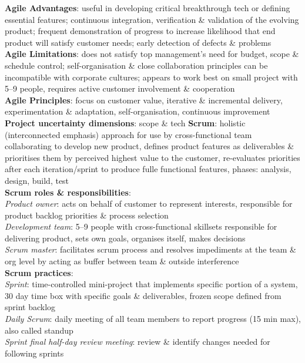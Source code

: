 \documentclass[a4paper]{article}
\begin{document}
\begin{multicols}{2}
        \textbf{Agile Advantages}: useful in developing critical breakthrough tech or defining essential features; continuous integration, verification \& validation of the evolving product; frequent demonstration of progress to increase likelihood that end product will satisfy customer needs; early detection of defects \& problems\\
        \textbf{Agile Limitations}: does not satisfy top management's need for budget, scope \& schedule control; self-organisation \& close collaboration principles can be incompatible with corporate cultures; appears to work best on small project with 5--9 people, requires active customer involvement \& cooperation\\
        \textbf{Agile Principles}: focus on customer value, iterative \& incremental delivery, experimentation \& adaptation, self-organisation, continuous improvement\\
        \textbf{Project uncertainty dimensions}: scope \& tech
        \textbf{Scrum}: holistic (interconnected emphasis) approach for use by cross-functional team collaborating to develop new product, defines product features as deliverables \& prioritises them by perceived highest value to the customer, re-evaluates priorities after each iteration/sprint to produce fulle functional features, phases: analysis, design, build, test\\
        \textbf{Scrum roles \& responsibilities}:\\
        \textit{Product owner}: acts on behalf of customer to represent interests, responsible for product backlog priorities \& process selection\\
        \textit{Development team}: 5--9 people with cross-functional skillsets responsible for delivering product, sets own goals, organises itself, makes decisions\\
        \textit{Scrum master}: facilitates scrum process and resolves impediments at the team \& org level by acting as buffer between team \& outside interference\\
        \textbf{Scrum practices}:\\
        \textit{Sprint}: time-controlled mini-project that implements specific portion of a system, 30 day time box with specific goals \& deliverables, frozen scope defined from sprint backlog\\
        \textit{Daily Scrum}: daily meeting of all team members to report progress (15 min max), also called standup\\
        \textit{Sprint final half-day review meeting}: review \& identify changes needed for following sprints\\

\end{multicols}
\end{document}

